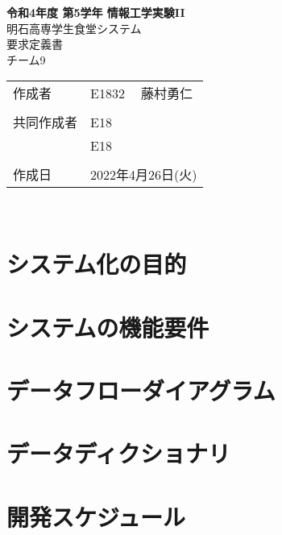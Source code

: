 \documentclass[dvipdfmx, 11pt]{jsarticle}
\begin{document}
\begin{titlepage}
    \centering
    \textbf{令和4年度 第5学年 情報工学実験II}
    \vspace{40pt} \\
    {\LARGE 明石高専学生食堂システム}
    \vspace{10pt} \\
    {\LARGE 要求定義書}
    \vspace{80pt} \\
    チーム9
    \vspace{10pt} \\
    \begin{tabular}{lll}
        作成者      & E1832 & 藤村勇仁 \\
                    &       & \\
        共同作成者  & E18 &  \\
                    & E18 &  \\
                    &       & \\
        作成日      & \multicolumn{2}{l}{2022年4月26日(火)}
    \end{tabular}
    \vspace{\baselineskip} \\
\end{titlepage}

\section{システム化の目的}


\section{システムの機能要件}


\section{データフローダイアグラム}


\section{データディクショナリ}


\section{開発スケジュール}
\end{document}
